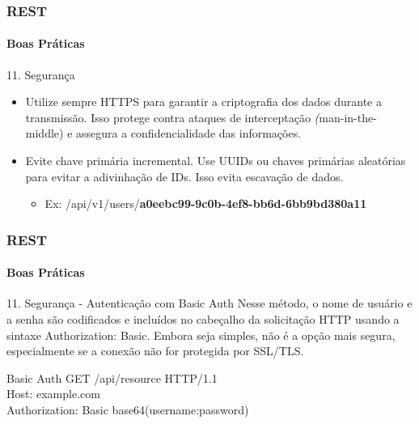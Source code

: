 \documentclass[
	9pt, %
	t, %
]{beamer}
\newcommand{\yellowbox}[1]{\colorbox{yellow!75}{#1}}
\begin{document}
\begin{frame}
	\frametitle{REST}
	\framesubtitle{Boas Práticas}
	
	\begin{block}{11. Segurança}
		\begin{itemize}
			\item Utilize sempre HTTPS para garantir a criptografia dos dados durante a transmissão. Isso protege contra ataques de interceptação \yellowbox{\textit(man-in-the-middle)} e assegura a confidencialidade das informações.
			\item Evite chave primária incremental. Use UUIDs ou chaves primárias aleatórias para evitar a adivinhação de IDs. Isso evita \yellowbox{escavação de dados}.
			\begin{itemize}
				\item Ex: /api/v1/users/\textbf{a0eebc99-9c0b-4ef8-bb6d-6bb9bd380a11} 
			\end{itemize}
		\end{itemize}
	\end{block}

\end{frame}

\begin{frame}
	\frametitle{REST}
	\framesubtitle{Boas Práticas}
	
	\begin{block}{11. Segurança - Autenticação com Basic Auth}
		Nesse método, o nome de usuário e a senha são codificados e incluídos no cabeçalho da solicitação HTTP usando a sintaxe \yellowbox{Authorization: Basic}. Embora seja simples, não é a opção mais segura, especialmente se a conexão não for protegida por SSL/TLS.
	\end{block}

	\begin{exampleblock}{Basic Auth}
		{ \small GET /api/resource HTTP/1.1 } \\
		{ \small Host: example.com } \\
		{ \small Authorization: Basic base64(username:password) } \\
	\end{exampleblock}

\end{frame}
\end{document}
